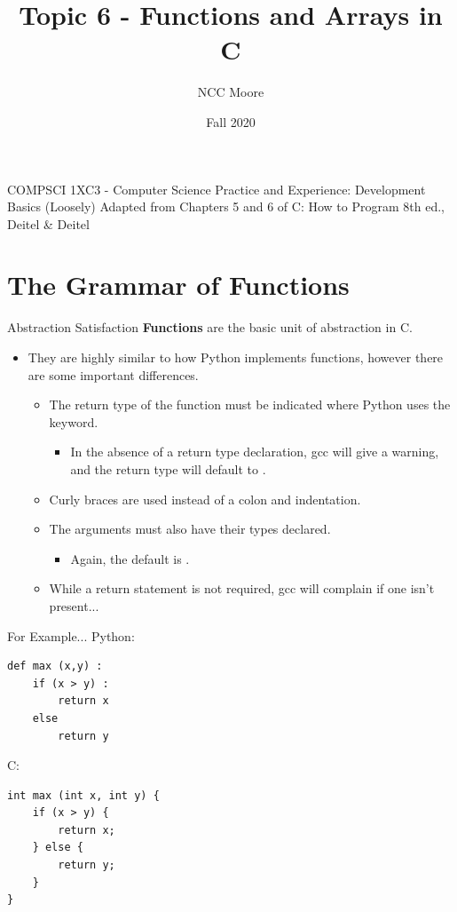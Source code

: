 \documentclass[11pt]{beamer}
\author{NCC Moore}
\title{Topic 6 - Functions and Arrays in C}
\institute{McMaster University}
\date{Fall 2020}
\let\OldTexttt\texttt
\renewcommand{\texttt}[1]{\OldTexttt{\color{teal}{#1}}}
\begin{document}
\begin{frame}
\center
COMPSCI 1XC3 - Computer Science Practice and Experience:
Development Basics
\titlepage
(Loosely) Adapted from Chapters 5 and 6 of C: How to Program 8th ed., Deitel \& Deitel
\end{frame}

\begin{frame}
\tableofcontents
\end{frame}

\section[syntax]{The Grammar of Functions} %
\begin{frame}{Abstraction Satisfaction}
\textbf{Functions} are the basic unit of abstraction in C.
\begin{itemize}
\item They are highly similar to how Python implements functions, however there are some important differences.  
\begin{itemize}
\item The return type of the function must be indicated where Python uses the \texttt{def} keyword.
\begin{itemize}
\item In the absence of a return type declaration, gcc will give a warning, and the return type will default to \texttt{int}.
\end{itemize}
\item Curly braces are used instead of a colon and indentation.
\item The arguments must also have their types declared.
\begin{itemize}
\item Again, the default is \texttt{int}.
\end{itemize}
\item While a return statement is not required, gcc will complain if one isn't present...
\end{itemize}
\end{itemize}
\end{frame}

\begin{frame}[fragile=singleslide]{For Example...}
Python:
\begin{lstlisting}[style=Python]
def max (x,y) :
	if (x > y) :
		return x
	else 
		return y
\end{lstlisting}
C: 
\begin{lstlisting}[style=C]
int max (int x, int y) {
	if (x > y) {
		return x;
	} else {
		return y;
	}
}
\end{lstlisting}
\end{frame}
\end{document}
